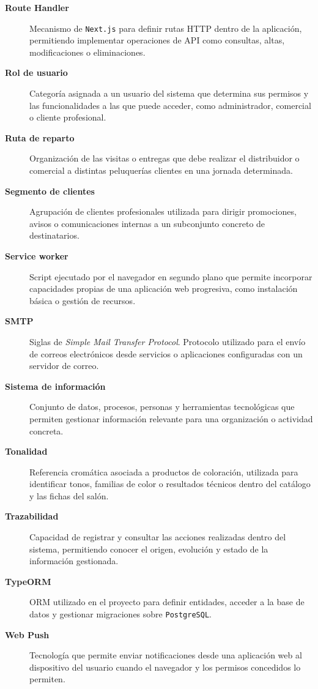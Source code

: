 \begin{description}
\item[\textbf{Route Handler}]
Mecanismo de \texttt{Next.js} para definir rutas HTTP dentro de la aplicación, permitiendo implementar operaciones de API como consultas, altas, modificaciones o eliminaciones.

\item[\textbf{Rol de usuario}]
Categoría asignada a un usuario del sistema que determina sus permisos y las funcionalidades a las que puede acceder, como administrador, comercial o cliente profesional.

\item[\textbf{Ruta de reparto}]
Organización de las visitas o entregas que debe realizar el distribuidor o comercial a distintas peluquerías clientes en una jornada determinada.

\item[\textbf{Segmento de clientes}]
Agrupación de clientes profesionales utilizada para dirigir promociones, avisos o comunicaciones internas a un subconjunto concreto de destinatarios.

\item[\textbf{Service worker}]
Script ejecutado por el navegador en segundo plano que permite incorporar capacidades propias de una aplicación web progresiva, como instalación básica o gestión de recursos.

\item[\textbf{SMTP}]
Siglas de \textit{Simple Mail Transfer Protocol}. Protocolo utilizado para el envío de correos electrónicos desde servicios o aplicaciones configuradas con un servidor de correo.

\item[\textbf{Sistema de información}]
Conjunto de datos, procesos, personas y herramientas tecnológicas que permiten gestionar información relevante para una organización o actividad concreta.

\item[\textbf{Tonalidad}]
Referencia cromática asociada a productos de coloración, utilizada para identificar tonos, familias de color o resultados técnicos dentro del catálogo y las fichas del salón.

\item[\textbf{Trazabilidad}]
Capacidad de registrar y consultar las acciones realizadas dentro del sistema, permitiendo conocer el origen, evolución y estado de la información gestionada.

\item[\textbf{TypeORM}]
ORM utilizado en el proyecto para definir entidades, acceder a la base de datos y gestionar migraciones sobre \texttt{PostgreSQL}.

\item[\textbf{Web Push}]
Tecnología que permite enviar notificaciones desde una aplicación web al dispositivo del usuario cuando el navegador y los permisos concedidos lo permiten.

\end{description}
